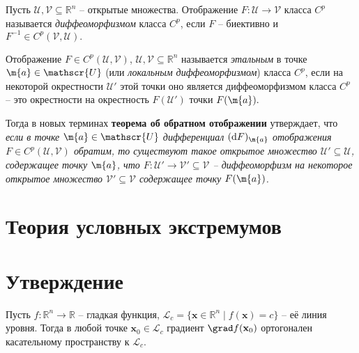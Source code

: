 \begin{definition}
    Пусть $\mathscr{U}, \mathscr{V} \subseteq \mathbb{R}^n$ -- открытые множества. Отображение $F:\mathscr{U} \to \mathscr{V}$ класса $C^p$ называется \textit{диффеоморфизмом} класса $C^p$, если $F$ -- биективно и $F^{-1} \in C^p(\mathscr{V}, \mathscr{U}).$
\end{definition}

\begin{definition}
    Отображение $F\in C^p(\mathscr{U}, \mathscr{V})$, $\mathscr{U}, \mathscr{V} \subseteq \mathbb{R}^n$ называется \textit{этальным} в точке $\m{a} \in \mathscr{U}$ (или \textit{локальным диффеоморфизмом}) класса $C^p$, если на некоторой окрестности $\mathscr{U}'$ этой точки оно является диффеоморфизмом класса $C^p$ -- это окрестности на окрестность $F(\mathscr{U'})$ точки $F(\m{a}).$
 \end{definition}

Тогда в новых терминах \textbf{теорема об обратном отображении} утверждает, что
\textit{если в точке $\m{a} \in \mathscr{U}$ дифференциал $(\mathrm{d}F)_\m{a}$ отображения $F \in C^p(\mathscr{U}, \mathscr{V})$ обратим, то существуют такое открытое множество $\mathscr{U}' \subseteq \mathscr{U}$, содержащее точку $\m{a}$, что $F:\mathscr{U}' \to \mathscr{V}' \subseteq \mathscr{V}$ -- диффеоморфизм на некоторое открытое множество $\mathscr{V}' \subseteq \mathscr{V}$ содержащее точку $F(\m{a})$.}


\section{Теория условных экстремумов}


\maketitle

\section*{Утверждение}
Пусть $f: \mathbb{R}^n \to \mathbb{R}$ -- гладкая функция, $\mathcal{L}_c = \{ \mathbf{x} \in \mathbb{R}^n \mid f(\mathbf{x}) = c \}$ -- её линия уровня. 
Тогда в любой точке $\mathbf{x}_0 \in \mathcal{L}_c$ градиент $\grad f(\mathbf{x}_0)$ ортогонален касательному пространству к $\mathcal{L}_c$.

